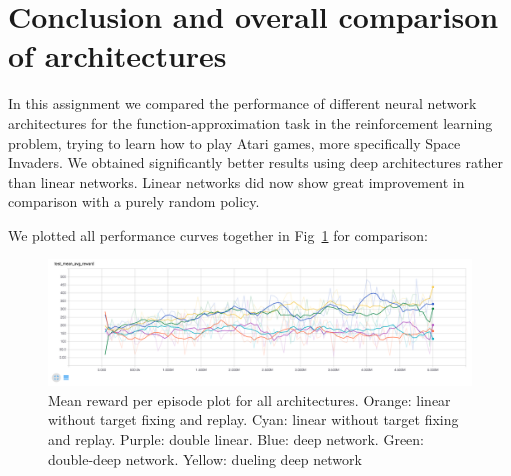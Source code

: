 \documentclass{article}
\begin{document}
\newpage
\section{Conclusion and overall comparison of architectures} %
\label{sec:conclusion_and_overall_comparison_of_architectures}
In this assignment we compared the performance of different neural network architectures for the function-approximation task in the reinforcement learning problem, trying to learn how to play Atari games, more specifically Space Invaders. We obtained significantly better results using deep architectures rather than linear networks. Linear networks did now show great improvement in comparison with a purely random policy.

We plotted all performance curves together in Fig~\ref{fig:r_all} for comparison:

\begin{figure}[h!] 
  \centering
  \label{fig:r_all}
  \includegraphics[width=1.0\textwidth]{images/r_all}
  \caption{Mean reward per episode plot for all architectures. Orange: linear without target fixing and replay. Cyan: linear without target fixing and replay. Purple: double linear. Blue: deep network. Green: double-deep network. Yellow: dueling deep network}
\end{figure}

\small
\medskip









\end{document}
